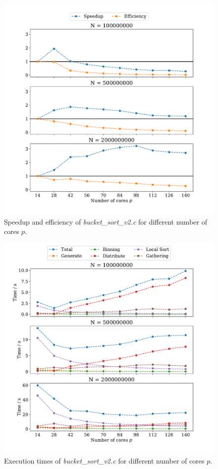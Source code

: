 \documentclass[a4paper, 11pt]{article}
\begin{document}
\begin{figure}
  \centering
  \includegraphics[width=\textwidth]{../part_1/plot/v2_speedup.pdf}
  \caption{Speedup and efficiency of \textit{bucket\_sort\_v2.c} for different
    number of cores $p$.}
  \label{fig:p1_v2_speedup}
\end{figure}
\begin{figure}
  \centering
  \includegraphics[width=\textwidth]{../part_1/plot/v2_times.pdf}
  \caption{Execution times of \textit{bucket\_sort\_v2.c} for different number
  of cores $p$.}
  \label{fig:p1_v2_times}
\end{figure}
\FloatBarrier
\end{document}
